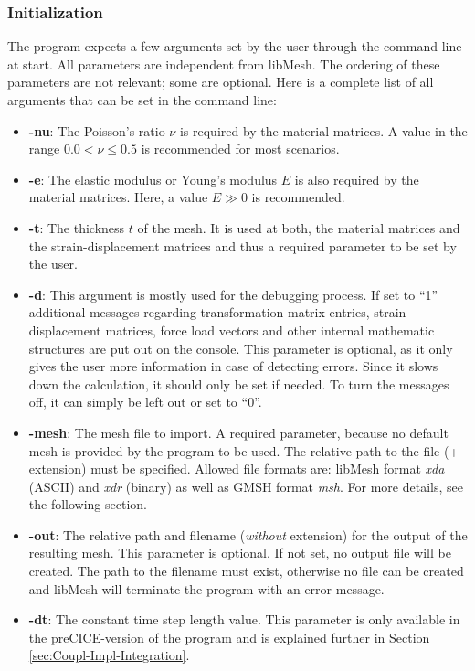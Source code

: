   \subsubsection{Initialization}\label{sec:Impl-Details-Init}
  The program expects a few arguments set by the user through the command line at start. All parameters are independent from libMesh. The ordering of these parameters are not relevant; some are optional. Here is a complete list of all arguments that can be set in the command line:
  \begin{itemize}
  	\item \textbf{-nu}: The Poisson's ratio $\nu$ is required by the material matrices. A value in the range $0.0 < \nu \leq 0.5$ is recommended for most scenarios.
  	\item \textbf{-e}: The elastic modulus or Young's modulus $E$ is also required by the material matrices. Here, a value $E \gg 0$ is recommended.
  	\item \textbf{-t}: The thickness $t$ of the mesh. It is used at both, the material matrices and the strain-displacement matrices and thus a required parameter to be set by the user.
  	\item \textbf{-d}: This argument is mostly used for the debugging process. If set to ``1'' additional messages regarding transformation matrix entries, strain-displacement matrices, force load vectors and other internal mathematic structures are put out on the console. This parameter is optional, as it only gives the user more information in case of detecting errors. Since it slows down the calculation, it should only be set if needed. To turn the messages off, it can simply be left out or set to ``0''.
  	\item \textbf{-mesh}: The mesh file to import. A required parameter, because no default mesh is provided by the program to be used. The relative path to the file (+ extension) must be specified. Allowed file formats are: libMesh format \textit{xda} (ASCII) and \textit{xdr} (binary) as well as GMSH format \textit{msh}. For more details, see the following section.
  	\item \textbf{-out}: The relative path and filename (\textit{without} extension) for the output of the resulting mesh. This parameter is optional. If not set, no output file will be created. The path to the filename must exist, otherwise no file can be created and libMesh will terminate the program with an error message.
  	\item \textbf{-dt}: The constant time step length value. This parameter is only available in the preCICE-version of the program and is explained further in Section \ref{sec:Coupl-Impl-Integration}.
  \end{itemize}
  
